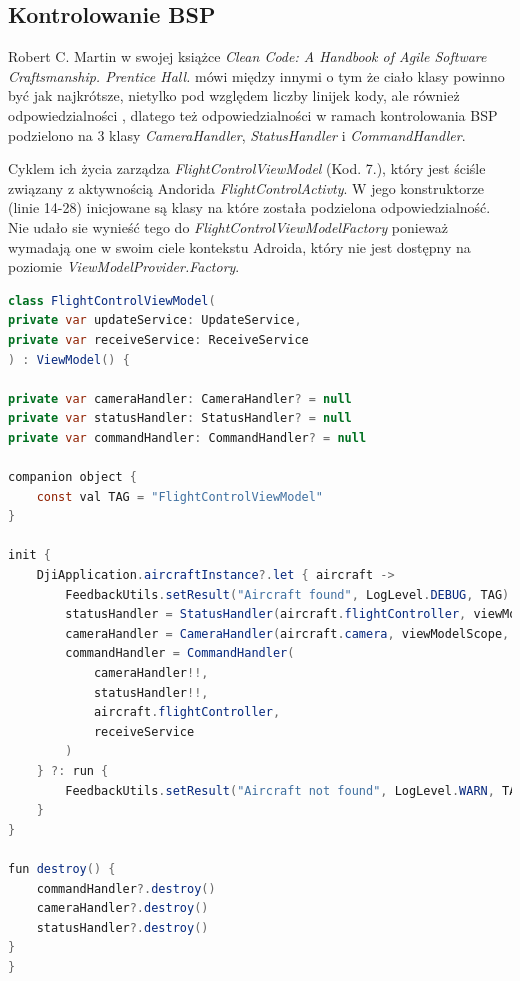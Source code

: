 \subsection{Kontrolowanie BSP}

Robert C. Martin w swojej książce \textit{Clean Code: A Handbook of Agile Software Craftsmanship. Prentice Hall.} mówi między innymi o tym że ciało klasy powinno być jak najkrótsze, nietylko pod względem liczby linijek kody, ale również odpowiedzialności \cite{clean-code}, dlatego też odpowiedzialności w ramach kontrolowania BSP podzielono na 3 klasy \textit{CameraHandler}, \textit{StatusHandler} i \textit{CommandHandler}. 

Cyklem ich życia zarządza \textit{FlightControlViewModel} (Kod. 7.), który jest ściśle związany z aktywnością Andorida \textit{FlightControlActivty}. W jego konstruktorze (linie 14-28) inicjowane są klasy na które została podzielona odpowiedzialność. Nie udało sie wynieść tego do \textit{FlightControlViewModelFactory} ponieważ wymadają one w swoim ciele kontekstu Adroida, który nie jest dostępny na poziomie \textit{ViewModelProvider.Factory}.

\begin{lstlisting}[language=Java, caption=Klasa \textit{FlightControlViewModel}]
class FlightControlViewModel(
private var updateService: UpdateService,
private var receiveService: ReceiveService
) : ViewModel() {

private var cameraHandler: CameraHandler? = null
private var statusHandler: StatusHandler? = null
private var commandHandler: CommandHandler? = null

companion object {
    const val TAG = "FlightControlViewModel"
}

init {
    DjiApplication.aircraftInstance?.let { aircraft ->
        FeedbackUtils.setResult("Aircraft found", LogLevel.DEBUG, TAG)
        statusHandler = StatusHandler(aircraft.flightController, viewModelScope, updateService)
        cameraHandler = CameraHandler(aircraft.camera, viewModelScope, updateService)
        commandHandler = CommandHandler(
            cameraHandler!!,
            statusHandler!!,
            aircraft.flightController,
            receiveService
        )
    } ?: run {
        FeedbackUtils.setResult("Aircraft not found", LogLevel.WARN, TAG)
    }
}

fun destroy() {
    commandHandler?.destroy()
    cameraHandler?.destroy()
    statusHandler?.destroy()
}
}
\end{lstlisting}

